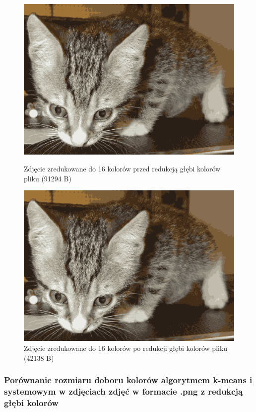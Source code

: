 \begin{figure}[H]
  \centering
  \begin{minipage}[b]{0.4\textwidth}
    \includegraphics[width=\textwidth]{photos/kmeans_16_32}
    \caption{Zdjęcie zredukowane do 16 kolorów przed redukcją głębi kolorów pliku (91294 B)}
  \end{minipage}
  \hfill
  \begin{minipage}[b]{0.4\textwidth}
    \includegraphics[width=\textwidth]{photos/kmeans_red_16_32}
    \caption{Zdjęcie zredukowane do 16 kolorów po redukcji głębi kolorów pliku (42138 B)}
  \end{minipage}
\end{figure}


\subsubsection{Porównanie rozmiaru doboru kolorów algorytmem k-means i systemowym w zdjęciach zdjęć w formacie .png z redukcją głębi kolorów}

